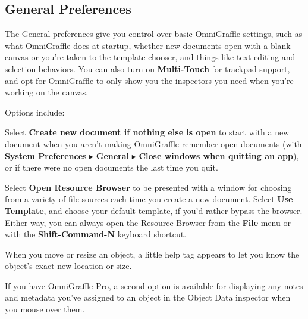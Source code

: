 \documentclass[../main.tex]{subfiles}
\begin{document}
\subsection{General Preferences}

The General preferences give you control over basic OmniGraffle settings, such as what
OmniGraffle does at startup, whether new documents open with a blank canvas or you're taken to
the template chooser, and things like text editing and selection behaviors. You can also turn
on \textbf{Multi-Touch} for trackpad support, and opt for OmniGraffle to only show you the
inspectors you need when you're working on the canvas.


Options include:

\begin{description}[style=nextline]
  \item[{Startup}] Select \textbf{Create new document if nothing else is open} to start with a
    new document when you aren't making OmniGraffle remember open documents (with \textbf{System
      Preferences} $\blacktriangleright$ \textbf{General} $\blacktriangleright$ \textbf{Close
    windows when quitting an app}), or if there were no open documents the last time you quit.
  \item[{New Documents}] Select \textbf{Open Resource Browser} to be presented with a window for
    choosing from a variety of file sources each time you create a new document. Select
    \textbf{Use Template}, and choose your default template, if you'd rather bypass the browser.
    Either way, you can always open the Resource Browser from the \textbf{File} menu or with the
    \textbf{Shift-Command-N} keyboard shortcut.
  \item[{Help Tags}] When you move or resize an object, a little help tag appears to let you
    know the object's exact new location or size.
\end{description}

\begin{ogpro}
  \begin{description}[style=nextline]
    \item[{Help Tags (\textbf{PRO})}] If you have OmniGraffle Pro, a second option is available
      for displaying any notes and metadata you've assigned to an object in the Object Data
      inspector when you mouse over them.
  \end{description}
\end{ogpro}
\end{document}
